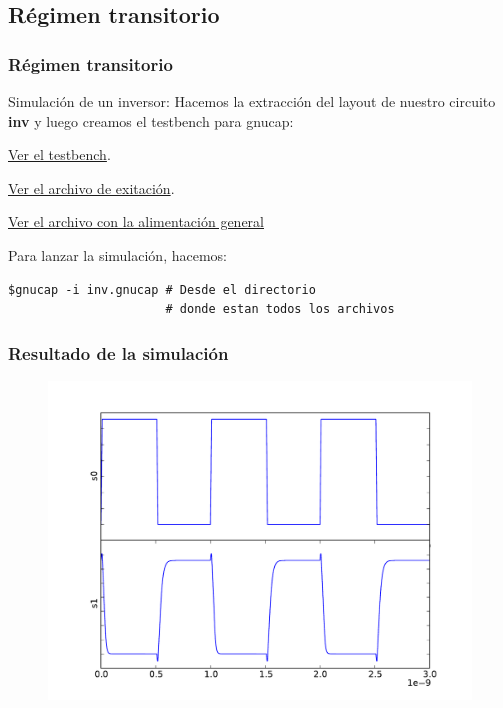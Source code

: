 \documentclass{beamer}
\begin{document}
\subsection{Régimen transitorio}
\begin{frame}[fragile]
\frametitle{Régimen transitorio}

Simulación de un inversor:
Hacemos la extracción del layout de nuestro circuito \textbf{inv} y luego creamos el testbench para gnucap:

\href{run:gnucap/inv.gnucap}{Ver el testbench}.

\href{run:gnucap/exitacion_inv.spi}{Ver el archivo de exitación}.

\href{run:gnucap/fuentes_general.spi}{Ver el archivo con la alimentación general}


Para lanzar la simulación, hacemos:
\begin{footnotesize}
\begin{verbatim}
$gnucap -i inv.gnucap # Desde el directorio 
                      # donde estan todos los archivos
\end{verbatim}
\end{footnotesize}


\end{frame}
\begin{frame}
  \frametitle{Resultado de la simulación}
\begin{figure}
\includegraphics[width=0.99\linewidth]{figuras/inv.pdf}
\end{figure}

\end{frame}
\end{document}

